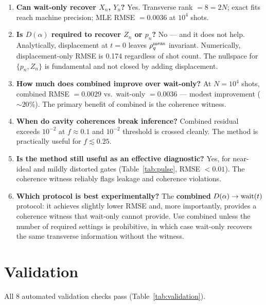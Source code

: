 \documentclass[11pt,onecolumn]{article}
\begin{document}
\begin{enumerate}
\item \textbf{Can wait-only recover $X_n$, $Y_n$?} Yes.  Transverse rank $= 8 = 2N$;
  exact fits reach machine precision; MLE RMSE $= 0.0036$ at $10^4$ shots.

\item \textbf{Is $D(\alpha)$ required to recover $Z_n$ or $p_n$?} No — and it does
  not help.  Analytically, displacement at $t=0$ leaves $\rho_q^{\rm meas}$
  invariant.  Numerically, displacement-only RMSE is 0.174 regardless of shot count.
  The nullspace for $\{p_n,Z_n\}$ is fundamental and not closed by adding displacement.

\item \textbf{How much does combined improve over wait-only?}  At $N=10^4$ shots,
  combined RMSE $= 0.0029$ vs.\ wait-only $= 0.0036$ — modest improvement
  ($\sim20\%$).  The primary benefit of combined is the coherence witness.

\item \textbf{When do cavity coherences break inference?}  Combined residual exceeds
  $10^{-2}$ at $f\approx0.1$ and $10^{-2}$ threshold is crossed cleanly.  The
  method is practically useful for $f\lesssim0.25$.

\item \textbf{Is the method still useful as an effective diagnostic?}  Yes, for
  near-ideal and mildly distorted gates (Table~\ref{tab:pulse}, RMSE $<0.01$).
  The coherence witness reliably flags leakage and coherence violations.

\item \textbf{Which protocol is best experimentally?}  The \textbf{combined}
  $D(\alpha)\to{\rm wait}(t)$ protocol: it achieves slightly lower RMSE and, more
  importantly, provides a coherence witness that wait-only cannot provide.  Use
  combined unless the number of required settings is prohibitive, in which case
  wait-only recovers the same transverse information without the witness.
\end{enumerate}

\section{Validation}

All 8 automated validation checks pass (Table~\ref{tab:validation}).
\end{document}
